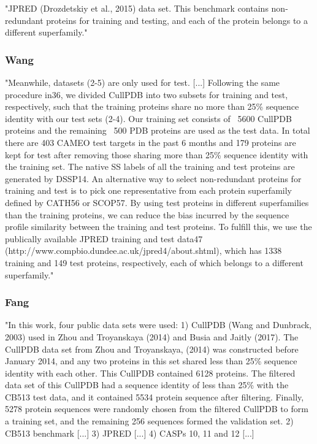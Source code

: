 \documentclass[]{scrartcl}
\begin{document}
"JPRED (Drozdetskiy et al., 2015) data set. This benchmark contains non-redundant proteins for training and testing, and each of the protein belongs to a different superfamily." \cite{Fang2017}

\subsubsection{Wang}
"Meanwhile, datasets (2-5) are only used for test. [...] Following the same procedure in36, we divided CullPDB into two subsets for training and test, respectively, such that the training proteins share no more than 25\% sequence identity with our test sets (2-4). Our training set consists of ~5600 CullPDB proteins and the remaining ~500 PDB proteins are used as the test data. In total there are 403 CAMEO test targets in the past 6 months and 179 proteins are kept for test after removing those sharing more than 25\% sequence identity with the training set.
The native SS labels of all the training and test proteins are generated by DSSP14.
An alternative way to select non-redundant proteins for training and test is to pick one representative from each protein superfamily defined by CATH56 or SCOP57. By using test proteins in different superfamilies than the training proteins, we can reduce the bias incurred by the sequence profile similarity between the training and test proteins. To fulfill this, we use the publically available JPRED training and test data47 (http://www.compbio.dundee.ac.uk/jpred4/about.shtml), which has 1338 training and 149 test proteins, respectively, each of which belongs to a different superfamily." \cite{Wang2016}
\subsubsection{Fang}
"In this work, four public data sets were used: 1) CullPDB (Wang and Dunbrack, 2003) used in Zhou and Troyanskaya (2014) and Busia and Jaitly (2017). The CullPDB data set from Zhou and Troyanskaya, (2014) was constructed before January 2014, and any two proteins in this set shared less than 25\% sequence identity with each other. This CullPDB contained 6128 proteins. The filtered data set of this CullPDB had a sequence identity of less than 25\% with the CB513 test data, and it contained 5534 protein sequence after filtering. Finally, 5278 protein sequences were randomly chosen from the filtered CullPDB to form a training set, and the remaining 256 sequences formed the validation set.
2) CB513 benchmark [...]
3) JPRED [...]
4) CASPs 10, 11 and 12 [...]
\end{document}
